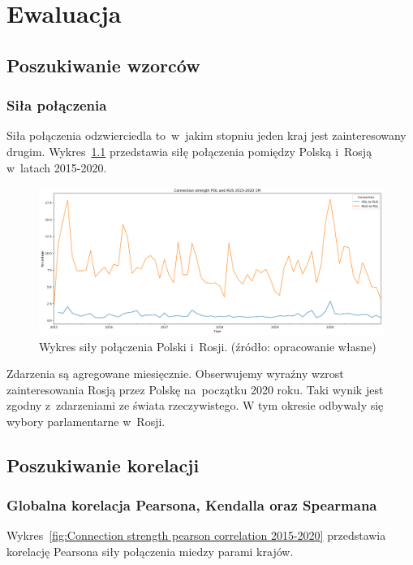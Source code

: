 \documentclass[11pt]{report}
\begin{document}
    \chapter{Ewaluacja}\label{ch:ewaluacja}


    \section{Poszukiwanie wzorców}\label{sec:poszukiwanie-wzorców}

    \subsection{Siła połączenia}
    Siła połączenia odzwierciedla to~w~jakim stopniu jeden kraj jest zainteresowany drugim.
    Wykres~\ref{fig:POL and RUSconnection 1M} przedstawia siłę połączenia pomiędzy Polską i~Rosją w~latach 2015-2020.

    \begin{figure}[!ht]
        \centering
        \includegraphics[width=\linewidth]{../spade_proto/figures/symmetry/POL and RUSconnection 1M.png}
        \caption{Wykres siły połączenia Polski i~Rosji. (źródło: opracowanie własne)}
        \label{fig:POL and RUSconnection 1M}
    \end{figure}

    Zdarzenia są agregowane miesięcznie.
    Obserwujemy wyraźny wzrost zainteresowania Rosją przez Polskę na~początku 2020 roku.
    Taki wynik jest zgodny z~zdarzeniami ze świata rzeczywistego.
    W tym okresie odbywały się wybory parlamentarne w~Rosji.


    \section{Poszukiwanie korelacji}\label{sec:poszukiwanie-korelacji}

    \subsection{Globalna korelacja Pearsona, Kendalla oraz Spearmana}
    Wykres~\ref{fig:Connection strength pearson correlation 2015-2020} przedstawia korelację Pearsona siły połączenia miedzy parami krajów.
\end{document}
